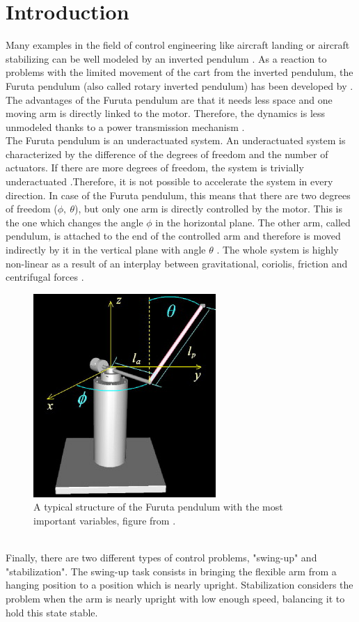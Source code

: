 \section{Introduction}
Many examples in the field of control engineering like aircraft landing or 
aircraft stabilizing can be well modeled by an inverted 
pendulum \citep{akhtaruzzaman2010modeling}. As a reaction to problems with the 
limited movement of the cart from 
the inverted pendulum, the Furuta pendulum (also called rotary inverted 
pendulum) 
has been developed by 
\cite{furuta1992swing}. The advantages of the Furuta pendulum are that 
it 
needs less space and one moving arm is directly linked to the motor. Therefore, 
the dynamics is less unmodeled thanks to a power transmission mechanism 
\citep{furuta1992swing}. \\
The Furuta pendulum is an underactuated system. An underactuated system is 
characterized by the difference of the degrees of freedom and the number of 
actuators. If there are more degrees of freedom, the system is trivially 
underactuated \citep{tedrake2009underactuated}.Therefore, it is not possible to 
accelerate the system in every direction. In case of the Furuta pendulum, this 
means that there are two degrees of freedom ($\phi,\ \theta$), 
but only one arm is directly controlled by the motor. This is the one which 
changes the angle $\phi$ in the horizontal plane. The other arm, called 
pendulum, 
is attached to 
the end of the controlled arm and therefore is moved indirectly by it in the 
vertical plane with angle $\theta$ 
\citep{spong1998underactuated,tedrake2009underactuated}. The whole system is 
highly non-linear as a result of an interplay between gravitational, coriolis, 
friction and centrifugal forces \citep{izutsu2008swing}.
\begin{figure}[h]
	\centering
	\includegraphics[width=0.5\linewidth]{pendulum}
	\caption{A typical structure of the Furuta pendulum with the most important 
	variables, figure from \cite{la2009new}.}
	\label{fig:pendulum}
\end{figure}\\
Finally, there are two different types of control problems, "swing-up" and 
"stabilization". The swing-up task consists in bringing the 
flexible arm from a hanging position to a position which is nearly upright. 
Stabilization considers the problem when the arm is nearly upright with low 
enough speed, balancing it to hold this state stable. 
